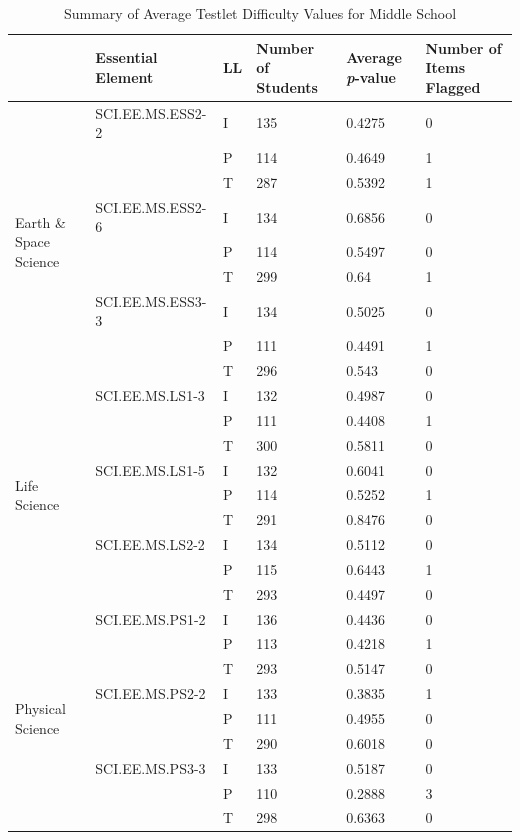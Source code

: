 \documentclass[11.5pt]{sig-alternate} %
\begin{document}
\clearpage

\begin{table}[t]
\caption*{Summary of Average Testlet Difficulty Values for Middle School}
\begin{tabular}{|l|l|l|l|l|l|}
\hline
& Essential Element & LL & Number of Students & Average \textit{p}-value & Number of Items Flagged \\ \hline
\multirow{9}{*}{Earth \& Space Science} & SCI.EE.MS.ESS2-2 & I & 135 & 0.4275 & 0 \\  \cline{2-6}
 & & P & 114 & 0.4649 & 1 \\  \cline{2-6}
 & & T & 287 & 0.5392 & 1 \\  \cline{2-6}
 & SCI.EE.MS.ESS2-6 & I & 134 & 0.6856 & 0 \\  \cline{2-6}
 & & P & 114 & 0.5497 & 0 \\  \cline{2-6}
 & & T & 299 & 0.64 & 1 \\  \cline{2-6}
 & SCI.EE.MS.ESS3-3 & I & 134 & 0.5025 & 0 \\  \cline{2-6}
 & & P & 111 & 0.4491 & 1 \\  \cline{2-6}
 & & T & 296 & 0.543 & 0 \\  \hline
\multirow{9}{*}{Life Science} & SCI.EE.MS.LS1-3 & I & 132 & 0.4987 & 0 \\ \cline{2-6}
 & & P & 111 & 0.4408 & 1 \\  \cline{2-6}
 & & T & 300 & 0.5811 & 0 \\  \cline{2-6}
 & SCI.EE.MS.LS1-5 & I & 132 & 0.6041 & 0 \\  \cline{2-6}
 & & P & 114 & 0.5252 & 1 \\  \cline{2-6}
 & & T & 291 & 0.8476 & 0 \\  \cline{2-6}
 & SCI.EE.MS.LS2-2 & I & 134 & 0.5112 & 0 \\  \cline{2-6}
 & & P & 115 & 0.6443 & 1 \\  \cline{2-6}
 & & T & 293 & 0.4497 & 0 \\  \hline
\multirow{9}{*}{Physical Science} & SCI.EE.MS.PS1-2 & I & 136 & 0.4436 & 0 \\ \cline{2-6}
 & & P & 113 & 0.4218 & 1 \\  \cline{2-6}
 & & T & 293 & 0.5147 & 0 \\  \cline{2-6}
 & SCI.EE.MS.PS2-2 & \cellcolor{yellow}I & \cellcolor{yellow}133 & \cellcolor{yellow}0.3835 & \cellcolor{yellow}1 \\  \cline{2-6}
 & & P & 111 & 0.4955 & 0 \\  \cline{2-6}
 & & T & 290 & 0.6018 & 0 \\  \cline{2-6}
 & SCI.EE.MS.PS3-3 & I & 133 & 0.5187 & 0 \\  \cline{2-6}
 & & \cellcolor{yellow}P & \cellcolor{yellow}110 & \cellcolor{yellow}0.2888 & \cellcolor{yellow}3 \\  \cline{2-6}
 & & T & 298 & 0.6363 & 0 \\ \hline
\end{tabular}
\end{table}
\end{document}

